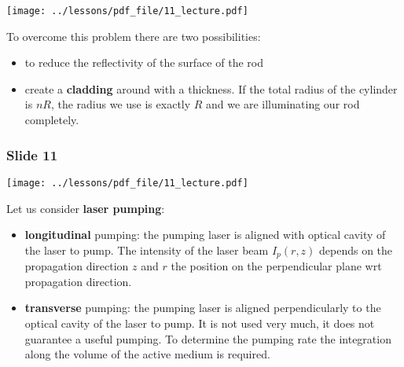 \documentclass[../main/main.tex]{subfiles}
\begin{document}
\begin{minipage}[]{0.5\linewidth}
\centering
\texttt{[image: ../lessons/pdf\_file/11\_lecture.pdf]}
\end{minipage}
\hspace{0.3cm}\vspace{0.3cm}
\begin{minipage}[c]{0.47\linewidth}

To overcome this problem there are two possibilities:
\begin{itemize}
\item to reduce the reflectivity of the surface of the rod

\item create a \textbf{cladding} around with a thickness. If the total radius of the cylinder is \( n R \), the radius we use is exactly \( R \) and we are illuminating our rod completely.

\end{itemize}


\end{minipage}

\subsubsection*{Slide 11}

\begin{minipage}[]{0.5\linewidth}
\centering
\texttt{[image: ../lessons/pdf\_file/11\_lecture.pdf]}
\end{minipage}
\hspace{0.3cm}\vspace{0.3cm}
\begin{minipage}[c]{0.47\linewidth}

Let us consider \textbf{laser pumping}:

\begin{itemize}
\item \textbf{longitudinal} pumping: the pumping laser is aligned with optical cavity of the laser to pump. The intensity of the laser beam \( I_p (r,z) \) depends on the propagation direction \( z \) and \( r \) the position on the perpendicular plane wrt propagation direction.

\item \textbf{transverse} pumping: the pumping laser is aligned perpendicularly to the optical cavity of the laser to pump.
It is not used very much, it does not guarantee a useful pumping.
To determine the pumping rate the integration along the volume of the active medium is required.

\end{itemize}

\end{minipage}
\end{document}
